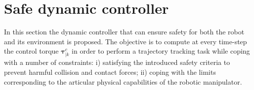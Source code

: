 \documentclass[letterpaper, 10 pt, conference]{ieeeconf}      %
\begin{document}
\section{Safe dynamic controller}
\label{sec:safe_controller}
In this section the dynamic controller that can ensure safety for both the robot and its environment is proposed. The objective is to compute at every time-step the control torque $\boldsymbol{\tau}_{|k}^{c}$ in order to perform a trajectory tracking task while coping with a number of constraints: i) satisfying the introduced safety criteria to prevent harmful collision and contact forces; ii) coping with the limits corresponding to the articular physical capabilities of the robotic manipulator.
\end{document}
